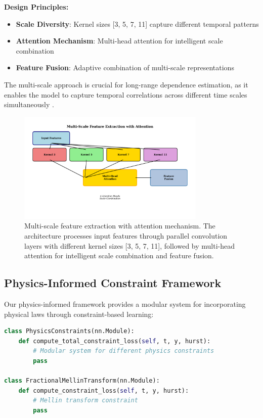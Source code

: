 \textbf{Design Principles:}
\begin{itemize}
    \item \textbf{Scale Diversity}: Kernel sizes [3, 5, 7, 11] capture different temporal patterns
    \item \textbf{Attention Mechanism}: Multi-head attention for intelligent scale combination
    \item \textbf{Feature Fusion}: Adaptive combination of multi-scale representations
\end{itemize}

The multi-scale approach is crucial for long-range dependence estimation, as it enables the model to capture temporal correlations across different time scales simultaneously \cite{he2016deep, szegedy2015going}.

\begin{figure}[h]
\centering
\includegraphics[width=0.8\textwidth]{multi_scale_processing.png}
\caption{Multi-scale feature extraction with attention mechanism. The architecture processes input features through parallel convolution layers with different kernel sizes [3, 5, 7, 11], followed by multi-head attention for intelligent scale combination and feature fusion.}
\label{fig:multi_scale_processing}
\end{figure}

\subsection{Physics-Informed Constraint Framework}

Our physics-informed framework provides a modular system for incorporating physical laws through constraint-based learning:

\begin{lstlisting}[language=Python, caption=Physics Constraint System]
class PhysicsConstraints(nn.Module):
    def compute_total_constraint_loss(self, t, y, hurst):
        # Modular system for different physics constraints
        pass

class FractionalMellinTransform(nn.Module):
    def compute_constraint_loss(self, t, y, hurst):
        # Mellin transform constraint
        pass
\end{lstlisting}

